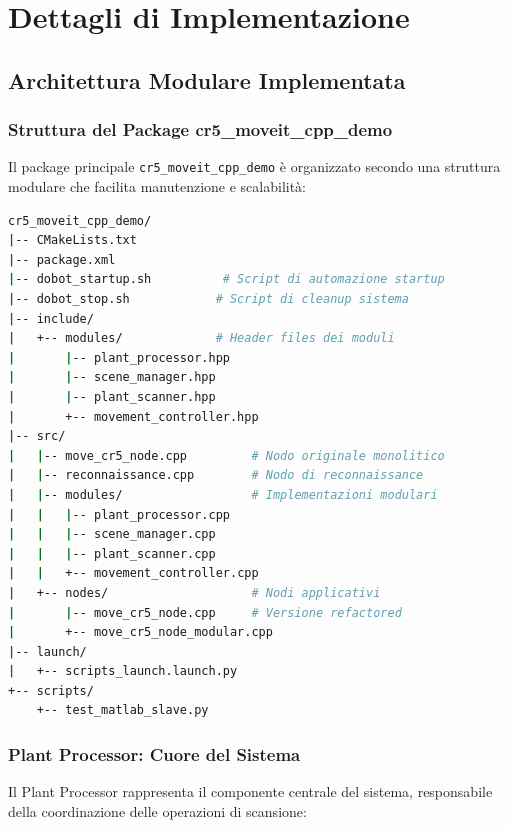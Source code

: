 \documentclass[12pt,a4paper,twoside,openright]{book}
\begin{document}
\chapter{Dettagli di Implementazione}
\label{chap:implementazione}

\section{Architettura Modulare Implementata}

\subsection{Struttura del Package cr5\_moveit\_cpp\_demo}

Il package principale \texttt{cr5\_moveit\_cpp\_demo} è organizzato secondo una struttura modulare che facilita manutenzione e scalabilità:

\begin{lstlisting}[language=bash, caption={Struttura del package principale}]
cr5_moveit_cpp_demo/
|-- CMakeLists.txt
|-- package.xml
|-- dobot_startup.sh          # Script di automazione startup
|-- dobot_stop.sh            # Script di cleanup sistema
|-- include/
|   +-- modules/             # Header files dei moduli
|       |-- plant_processor.hpp
|       |-- scene_manager.hpp
|       |-- plant_scanner.hpp
|       +-- movement_controller.hpp
|-- src/
|   |-- move_cr5_node.cpp         # Nodo originale monolitico
|   |-- reconnaissance.cpp        # Nodo di reconnaissance
|   |-- modules/                  # Implementazioni modulari
|   |   |-- plant_processor.cpp
|   |   |-- scene_manager.cpp
|   |   |-- plant_scanner.cpp
|   |   +-- movement_controller.cpp
|   +-- nodes/                    # Nodi applicativi
|       |-- move_cr5_node.cpp     # Versione refactored
|       +-- move_cr5_node_modular.cpp
|-- launch/
|   +-- scripts_launch.launch.py
+-- scripts/
    +-- test_matlab_slave.py
\end{lstlisting}

\subsection{Plant Processor: Cuore del Sistema}

Il Plant Processor rappresenta il componente centrale del sistema, responsabile della coordinazione delle operazioni di scansione:
\end{document}
